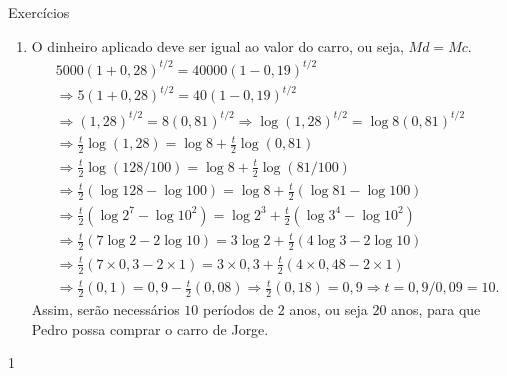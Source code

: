 \begin{answer}{Exercícios}
{\begin{enumerate}
	\item
		O dinheiro aplicado deve ser igual ao valor do carro, ou seja, $Md = Mc$.
		\begin{align*}
		&5000(1+0{,}28)^{t/2} = 40000(1-0{,}19)^{t/2} \\
		&\Rightarrow  5(1+0{,}28)^{t/2} = 40(1-0{,}19)^{t/2}\\
		&\Rightarrow  (1{,}28)^{t/2} = 8(0{,}81)^{t/2}\Rightarrow  \log (1{,}28)^{t/2} = \log 8(0{,}81)^{t/2}\\
		&\Rightarrow  \frac{t}{2}\log (1{,}28) = \log 8 + \frac{t}{2}\log(0{,}81)\\
		&\Rightarrow  \frac{t}{2}\log (128/100) = \log 8 + \frac{t}{2}\log(81/100)\\
		&\Rightarrow  \frac{t}{2}(\log 128-\log 100) = \log 8 + \frac{t}{2}(\log81-\log 100)\\
		&\Rightarrow  \frac{t}{2}(\log 2^7-\log 10^2) = \log 2^3 + \frac{t}{2}(\log 3^4-\log 10^2)\\
		&\Rightarrow  \frac{t}{2}(7\log 2-2\log 10) = 3\log 2 + \frac{t}{2}(4\log 3-2\log 10)\\
		&\Rightarrow  \frac{t}{2}(7\times 0{,}3-2\times 1) = 3 \times 0{,}3 + \frac{t}{2}(4 \times 0{,}48-2\times 1)\\
		&\Rightarrow  \frac{t}{2}(0{,}1) = 0{,}9 - \frac{t}{2}(0{,}08)\Rightarrow  \frac{t}{2}(0{,}18) = 0{,}9\Rightarrow  t = 0{,}9/0{,}09 = 10.
		\end{align*}
		Assim, serão necessários $10$ períodos de $2$ anos, ou seja $20$ anos, para que Pedro possa comprar o carro de Jorge.
	\end{enumerate}
}{1}
\end{answer}
\clearmargin
